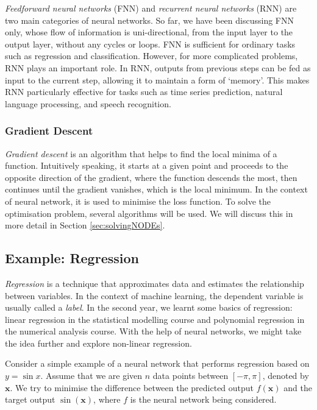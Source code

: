 \documentclass[a4paper,11pt,titlepage]{article}
\theoremstyle{definition}
\theoremstyle{plain}
\theoremstyle{remark}
\begin{document}
\textit{Feedforward neural networks} (FNN) and \textit{recurrent neural networks} (RNN) are two main categories of neural networks. So far, we have been discussing FNN only, whose flow of information is uni-directional, from the input layer to the output layer, without any cycles or loops. FNN is sufficient for ordinary tasks such as regression and classification. However, for more complicated problems, RNN plays an important role. In RNN, outputs from previous steps can be fed as input to the current step, allowing it to maintain a form of ‘memory’. This makes RNN particularly effective for tasks such as time series prediction, natural language processing, and speech recognition.

\subsubsection{Gradient Descent}

\textit{Gradient descent} is an algorithm that helps to find the local minima of a function. Intuitively speaking, it starts at a given point and proceeds to the opposite direction of the gradient, where the function descends the most, then continues until the gradient vanishes, which is the local minimum. In the context of neural network, it is used to minimise the loss function. To solve the optimisation problem, several algorithms will be used. We will discuss this in more detail in Section \ref{sec:solvingNODEs}.

\subsection{Example: Regression}

\textit{Regression} is a technique that approximates data and estimates the relationship between variables. In the context of machine learning, the dependent variable is usually called a \textit{label}. In the second year, we learnt some basics of regression: linear regression in the statistical modelling course and polynomial regression in the numerical analysis course. With the help of neural networks, we might take the idea further and explore non-linear regression.

Consider a simple example of a neural network that performs regression based on $y = \sin x$. Assume that we are given $n$ data points between $[-\pi, \pi]$, denoted by $\mathbf{x}$. We try to minimise the difference between the predicted output $f(\mathbf{x})$ and the target output $\sin (\mathbf{x})$, where $f$ is the neural network being considered.
\end{document}
